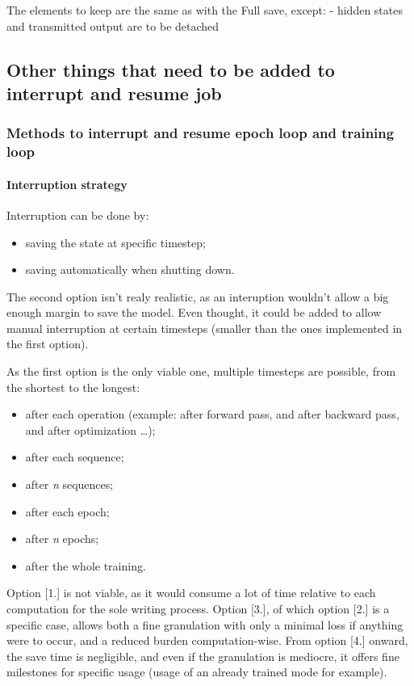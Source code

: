 The elements to keep are the same as with the Full save, except: -
hidden states and transmitted output are to be detached

\subsection{Other things that need to be added to interrupt and resume
job}

\subsubsection{Methods to interrupt and resume epoch loop and training
loop}

\paragraph{Interruption strategy}

Interruption can be done by:
\begin{itemize}
\item saving the state at specific timestep;
\item saving automatically when shutting down.
\end{itemize}

The second option isn't realy realistic, as an interuption wouldn't
allow a big enough margin to save the model. Even thought, it could be
added to allow manual interruption at certain timesteps (smaller than
the ones implemented in the first option).

As the first option is the only viable one, multiple timesteps are
possible, from the shortest to the longest:
\begin{itemize}
\item after each operation (example: after forward pass, and after backward pass, and after optimization \ldots{});
\item after each sequence;
\item after \emph{n} sequences;
\item  after each epoch;
\item  after \emph{n} epochs;
\item  after the whole training.
\end{itemize}

Option {[}1.{]} is not viable, as it would consume a lot of time
relative to each computation for the sole writing process. Option
{[}3.{]}, of which option {[}2.{]} is a specific case, allows both a
fine granulation with only a minimal loss if anything were to occur, and
a reduced burden computation-wise. From option {[}4.{]} onward, the save
time is negligible, and even if the granulation is mediocre, it offers
fine milestones for specific usage (usage of an already trained mode for
example).


